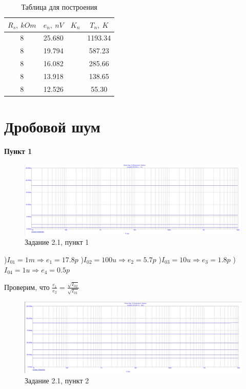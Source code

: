 \documentclass[a4paper, 14pt]{extarticle}%
\begin{document}
\begin{table}[h!]
  \caption{Таблица для построения}
  \begin{center}
  	\begin{tabular}{|c|c|c|c|}
  	    \hline
  	$R_s, \: kOm$ & $e_n, \: nV$ & $K_n$ & $T_n, \: K$ \\
  	    \hline
  	8 & 25.680 &  & 1193.34   \\
  		\hline
  	8 & 19.794 &  & 587.23    \\
  		\hline
  	8 & 16.082  &   & 285.66   \\
  		\hline
    8 & 13.918  &   &  138.65   \\
        \hline
    8 & 12.526  &   & 55.30    \\
        \hline
  	\end{tabular}
  \end{center}
\label{B_table}
\end{table}


\newpage
\newpage
\section{Дробовой шум}
\textbf{Пункт 1}
\begin{figure}[h!]
			\centering
			\includegraphics[width=1.1\linewidth]{2.1/pic12.jpg}
			\caption{Задание 2.1, пункт 1}
			\label{A}
\end{figure}

)$I_{01} = 1m \Rightarrow e_1 = 17.8p$
)$I_{02} = 100u \Rightarrow e_2 = 5.7p$
)$I_{03} = 10u \Rightarrow e_3 = 1.8p$
)$I_{04} = 1u \Rightarrow e_4 = 0.5p$
\newline

Проверим, что $\frac{e_1}{e_2} = \frac{\sqrt{I_{02}}}{\sqrt{I_{01}}}$
\newline

\begin{figure}[h!]
			\centering
			\includegraphics[width=1.1\linewidth]{2.1/pic11.jpg}
			\caption{Задание 2.1, пункт 2}
			\label{A}
\end{figure}
\end{document}
